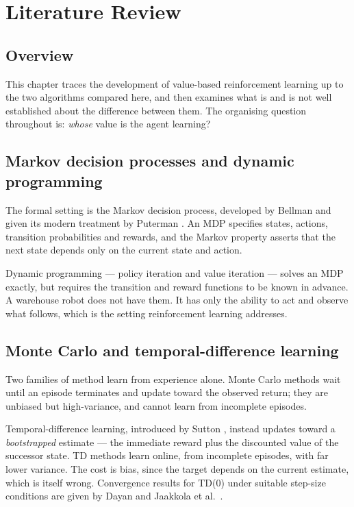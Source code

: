 \chapter{Literature Review}
\label{ch:literature}

\section{Overview}

This chapter traces the development of value-based reinforcement learning up to the two algorithms
compared here, and then examines what is and is not well established about the difference between
them. The organising question throughout is: \emph{whose} value is the agent learning?

\section{Markov decision processes and dynamic programming}

The formal setting is the Markov decision process, developed by Bellman \cite{bellman1957} and
given its modern treatment by Puterman \cite{puterman1994}. An MDP specifies states, actions,
transition probabilities and rewards, and the Markov property asserts that the next state depends
only on the current state and action.

Dynamic programming --- policy iteration and value iteration --- solves an MDP exactly, but
requires the transition and reward functions to be known in advance. A warehouse robot does not
have them. It has only the ability to act and observe what follows, which is the setting
reinforcement learning addresses.

\section{Monte Carlo and temporal-difference learning}

Two families of method learn from experience alone. Monte Carlo methods wait until an episode
terminates and update toward the observed return; they are unbiased but high-variance, and cannot
learn from incomplete episodes.

Temporal-difference learning, introduced by Sutton \cite{sutton1988}, instead updates toward a
\emph{bootstrapped} estimate --- the immediate reward plus the discounted value of the successor
state. TD methods learn online, from incomplete episodes, with far lower variance. The cost is
bias, since the target depends on the current estimate, which is itself wrong. Convergence results
for TD(0) under suitable step-size conditions are given by Dayan \cite{dayan1992} and
Jaakkola et al.\ \cite{jaakkola1994}.

